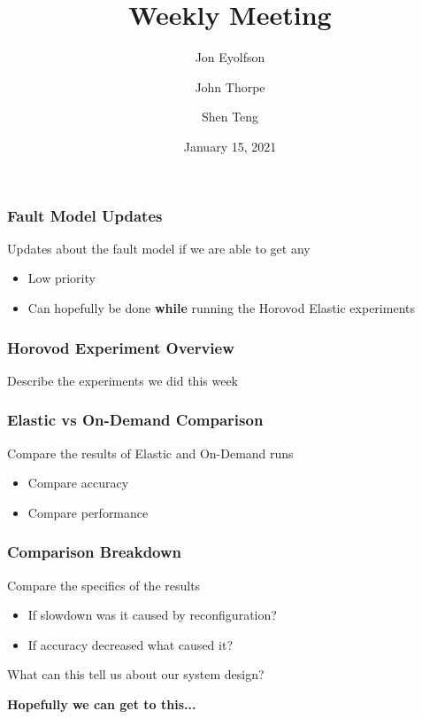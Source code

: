 
\title{Weekly Meeting}
\date{January 15, 2021}
\author{Jon Eyolfson \and John Thorpe \and Shen Teng}



  \begin{frame}[plain]
    \titlepage
  \end{frame}

  \setcounter{framenumber}{0}

  \begin{frame}
    \frametitle{Fault Model Updates}

    Updates about the fault model if we are able to get any
    \begin{itemize}
      \item Low priority
      \item Can hopefully be done \textbf{while} running the
        Horovod Elastic experiments
    \end{itemize}

  \end{frame}

  \begin{frame}
    \frametitle{Horovod Experiment Overview}

    Describe the experiments we did this week
  \end{frame}

  \begin{frame}
    \frametitle{Elastic vs On-Demand Comparison}

    Compare the results of Elastic and On-Demand runs
    \begin{itemize}
      \item Compare accuracy
      \item Compare performance
    \end{itemize}
  \end{frame}

  \begin{frame}
    \frametitle{Comparison Breakdown}

    Compare the specifics of the results
    \begin{itemize}
      \item If slowdown was it caused by reconfiguration?
      \item If accuracy decreased what caused it?
    \end{itemize}

    \vspace{1em}
    What can this tell us about our system design?

    \vspace{1em}
    \textbf{Hopefully we can get to this...}
  \end{frame}


